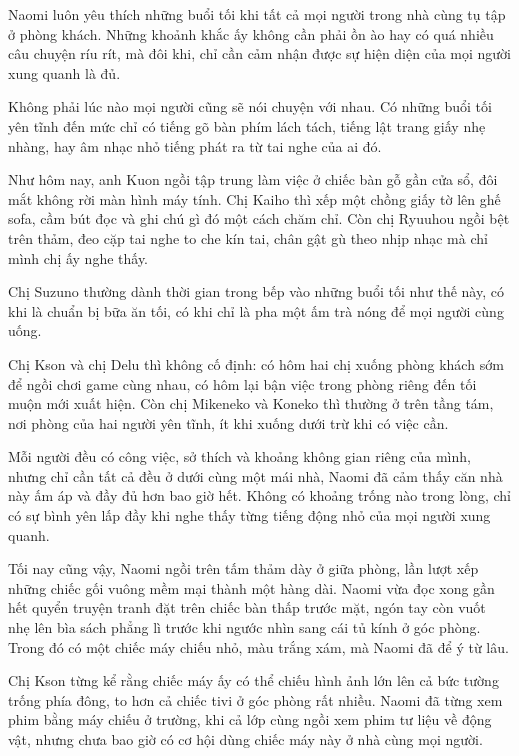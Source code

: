 \documentclass[../main.tex]{subfiles}
\begin{document}


Naomi luôn yêu thích những buổi tối khi tất cả mọi người trong nhà cùng tụ tập ở phòng khách. Những khoảnh khắc ấy không cần phải ồn ào hay có quá nhiều câu chuyện ríu rít, mà đôi khi, chỉ cần cảm nhận được sự hiện diện của mọi người xung quanh là đủ.

Không phải lúc nào mọi người cũng sẽ nói chuyện với nhau. Có những buổi tối yên tĩnh đến mức chỉ có tiếng gõ bàn phím lách tách, tiếng lật trang giấy nhẹ nhàng, hay âm nhạc nhỏ tiếng phát ra từ tai nghe của ai đó.

Như hôm nay, anh Kuon ngồi tập trung làm việc ở chiếc bàn gỗ gần cửa sổ, đôi mắt không rời màn hình máy tính. Chị Kaiho thì xếp một chồng giấy tờ lên ghế sofa, cầm bút đọc và ghi chú gì đó một cách chăm chỉ. Còn chị Ryuuhou ngồi bệt trên thảm, đeo cặp tai nghe to che kín tai, chân gật gù theo nhịp nhạc mà chỉ mình chị ấy nghe thấy.

Chị Suzuno thường dành thời gian trong bếp vào những buổi tối như thế này, có khi là chuẩn bị bữa ăn tối, có khi chỉ là pha một ấm trà nóng để mọi người cùng uống.

Chị Kson và chị Delu thì không cố định: có hôm hai chị xuống phòng khách sớm để ngồi chơi game cùng nhau, có hôm lại bận việc trong phòng riêng đến tối muộn mới xuất hiện. Còn chị Mikeneko và Koneko thì thường ở trên tầng tám, nơi phòng của hai người yên tĩnh, ít khi xuống dưới trừ khi có việc cần.

Mỗi người đều có công việc, sở thích và khoảng không gian riêng của mình, nhưng chỉ cần tất cả đều ở dưới cùng một mái nhà, Naomi đã cảm thấy căn nhà này ấm áp và đầy đủ hơn bao giờ hết. Không có khoảng trống nào trong lòng, chỉ có sự bình yên lấp đầy khi nghe thấy từng tiếng động nhỏ của mọi người xung quanh.

Tối nay cũng vậy, Naomi ngồi trên tấm thảm dày ở giữa phòng, lần lượt xếp những chiếc gối vuông mềm mại thành một hàng dài. Naomi vừa đọc xong gần hết quyển truyện tranh đặt trên chiếc bàn thấp trước mặt, ngón tay còn vuốt nhẹ lên bìa sách phẳng lì trước khi ngước nhìn sang cái tủ kính ở góc phòng. Trong đó có một chiếc máy chiếu nhỏ, màu trắng xám, mà Naomi đã để ý từ lâu.

Chị Kson từng kể rằng chiếc máy ấy có thể chiếu hình ảnh lớn lên cả bức tường trống phía đông, to hơn cả chiếc tivi ở góc phòng rất nhiều. Naomi đã từng xem phim bằng máy chiếu ở trường, khi cả lớp cùng ngồi xem phim tư liệu về động vật, nhưng chưa bao giờ có cơ hội dùng chiếc máy này ở nhà cùng mọi người.
\end{document}
